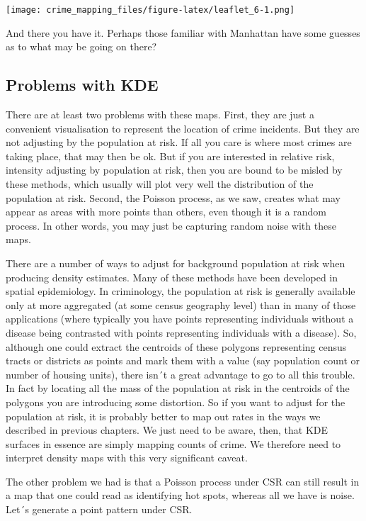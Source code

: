\documentclass[
  krantz2]{krantz}
\begin{document}
\texttt{[image: crime\_mapping\_files/figure-latex/leaflet\_6-1.png]}

And there you have it. Perhaps those familiar with Manhattan have some guesses as to what may be going on there?

\hypertarget{problems-with-kde}{%
\subsection{Problems with KDE}\label{problems-with-kde}}

There are at least two problems with these maps. First, they are just a convenient visualisation to represent the location of crime incidents. But they are not adjusting by the population at risk. If all you care is where most crimes are taking place, that may then be ok. But if you are interested in relative risk, intensity adjusting by population at risk, then you are bound to be misled by these methods, which usually will plot very well the distribution of the population at risk. Second, the Poisson process, as we saw, creates what may appear as areas with more points than others, even though it is a random process. In other words, you may just be capturing random noise with these maps.

There are a number of ways to adjust for background population at risk when producing density estimates. Many of these methods have been developed in spatial epidemiology. In criminology, the population at risk is generally available only at more aggregated (at some census geography level) than in many of those applications (where typically you have points representing individuals without a disease being contrasted with points representing individuals with a disease). So, although one could extract the centroids of these polygons representing census tracts or districts as points and mark them with a value (say population count or number of housing units), there isn´t a great advantage to go to all this trouble. In fact by locating all the mass of the population at risk in the centroids of the polygons you are introducing some distortion. So if you want to adjust for the population at risk, it is probably better to map out rates in the ways we described in previous chapters. We just need to be aware, then, that KDE surfaces in essence are simply mapping counts of crime. We therefore need to interpret density maps with this very significant caveat.

The other problem we had is that a Poisson process under CSR can still result in a map that one could read as identifying hot spots, whereas all we have is noise. Let´s generate a point pattern under CSR.
\end{document}
